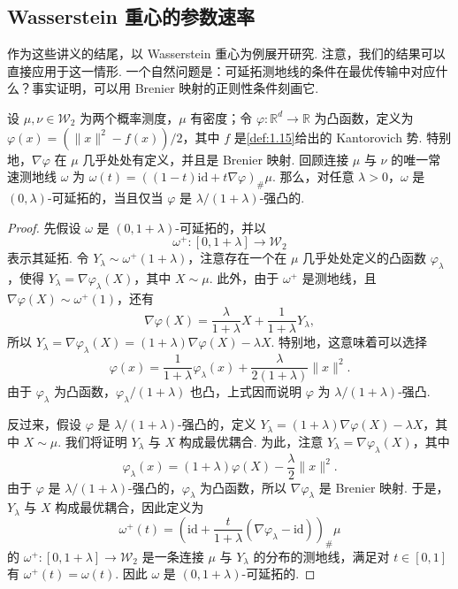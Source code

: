 \subsection{Wasserstein 重心的参数速率}\label{sec:8.3}
作为这些讲义的结尾，以 Wasserstein 重心为例展开研究. 注意，我们的结果可以直接应用于这一情形. 一个自然问题是：可延拓测地线的条件在最优传输中对应什么？事实证明，可以用 Brenier 映射的正则性条件刻画它.
\begin{theorem}\label{thm:8.10}
设 $\mu,\nu\in\mathcal W_2$ 为两个概率测度，$\mu$ 有密度；令 $\varphi:\mathbb R^d\to\mathbb R$ 为凸函数，定义为 $\varphi(x)=(\|x\|^2-f(x))/2$，其中 $f$ 是\autoref{def:1.15}给出的 Kantorovich 势. 特别地，$\nabla\varphi$ 在 $\mu$ 几乎处处有定义，并且是 Brenier 映射. 回顾连接 $\mu$ 与 $\nu$ 的唯一常速测地线 $\omega$ 为 $\omega(t)=((1-t)\mathrm{id}+t\nabla\varphi)_\#\mu$. 那么，对任意 $\lambda>0$，$\omega$ 是 $(0,\lambda)$-可延拓的，当且仅当 $\varphi$ 是 $\lambda/(1+\lambda)$-强凸的.
\end{theorem}
\begin{proof}
先假设 $\omega$ 是 $(0,1+\lambda)$-可延拓的，并以
$$\omega^+:[0,1+\lambda]\to\mathcal W_2$$
表示其延拓. 令 $Y_\lambda\sim\omega^+(1+\lambda)$，注意存在一个在 $\mu$ 几乎处处定义的凸函数 $\varphi_\lambda$，使得 $Y_\lambda=\nabla\varphi_\lambda(X)$，其中 $X\sim\mu$. 此外，由于 $\omega^+$ 是测地线，且 $\nabla\varphi(X)\sim\omega^+(1)$，还有
$$\nabla\varphi(X)=\frac\lambda{1+\lambda}X+\frac1{1+\lambda}Y_\lambda,$$
所以 $Y_\lambda=\nabla\varphi_\lambda(X)=(1+\lambda)\nabla\varphi(X)-\lambda X$. 特别地，这意味着可以选择
$$\varphi(x)=\frac1{1+\lambda}\varphi_\lambda(x)+\frac\lambda{2(1+\lambda)}\|x\|^2.$$
由于 $\varphi_\lambda$ 为凸函数，$\varphi_\lambda/(1+\lambda)$ 也凸，上式因而说明 $\varphi$ 为 $\lambda/(1+\lambda)$-强凸.

反过来，假设 $\varphi$ 是 $\lambda/(1+\lambda)$-强凸的，定义 $Y_\lambda=(1+\lambda)\nabla\varphi(X)-\lambda X$，其中 $X\sim\mu$. 我们将证明 $Y_\lambda$ 与 $X$ 构成最优耦合. 为此，注意 $Y_\lambda=\nabla\varphi_\lambda(X)$，其中
$$\varphi_\lambda(x)=(1+\lambda)\varphi(X)-\frac\lambda2\|x\|^2.$$
由于 $\varphi$ 是 $\lambda/(1+\lambda)$-强凸的，$\varphi_\lambda$ 为凸函数，所以 $\nabla\varphi_\lambda$ 是 Brenier 映射. 于是，$Y_\lambda$ 与 $X$ 构成最优耦合，因此定义为
$$\omega^+(t)=\left(\mathrm{id}+\frac t{1+\lambda}(\nabla\varphi_\lambda-\mathrm{id})\right)_\#\mu$$
的 $\omega^+:[0,1+\lambda]\to\mathcal W_2$ 是一条连接 $\mu$ 与 $Y_\lambda$ 的分布的测地线，满足对 $t\in[0,1]$ 有 $\omega^+(t)=\omega(t)$. 因此 $\omega$ 是 $(0,1+\lambda)$-可延拓的.
\end{proof}

